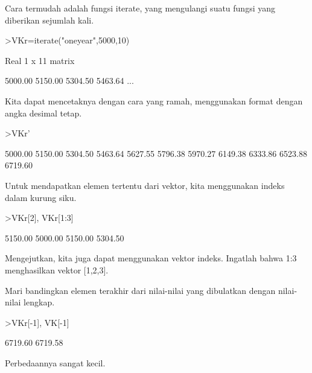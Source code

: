 \documentclass[a4paper,10pt]{article}
\begin{document}
\begin{eulernotebook}
\begin{eulercomment}
\begin{eulercomment}
\begin{eulercomment}
\begin{eulercomment}
\begin{eulercomment}
\begin{eulercomment}
\begin{eulercomment}
\begin{eulercomment}
\begin{eulercomment}
\begin{eulercomment}
\begin{eulercomment}
Cara termudah adalah fungsi iterate, yang mengulangi suatu fungsi yang
diberikan sejumlah kali.
\end{eulercomment}
\begin{eulerprompt}
>VKr=iterate("oneyear",5000,10)
\end{eulerprompt}
\begin{euleroutput}
  Real 1 x 11 matrix
  
      5000.00     5150.00     5304.50     5463.64     ...
\end{euleroutput}
\begin{eulercomment}
Kita dapat mencetaknya dengan cara yang ramah, menggunakan format
dengan angka desimal tetap.
\end{eulercomment}
\begin{eulerprompt}
>VKr'
\end{eulerprompt}
\begin{euleroutput}
      5000.00 
      5150.00 
      5304.50 
      5463.64 
      5627.55 
      5796.38 
      5970.27 
      6149.38 
      6333.86 
      6523.88 
      6719.60 
\end{euleroutput}
\begin{eulercomment}
Untuk mendapatkan elemen tertentu dari vektor, kita menggunakan indeks
dalam kurung siku.
\end{eulercomment}
\begin{eulerprompt}
>VKr[2], VKr[1:3]
\end{eulerprompt}
\begin{euleroutput}
      5150.00 
      5000.00     5150.00     5304.50 
\end{euleroutput}
\begin{eulercomment}
Mengejutkan, kita juga dapat menggunakan vektor indeks. Ingatlah bahwa
1:3 menghasilkan vektor [1,2,3].

Mari bandingkan elemen terakhir dari nilai-nilai yang dibulatkan
dengan nilai-nilai lengkap.
\end{eulercomment}
\begin{eulerprompt}
>VKr[-1], VK[-1]
\end{eulerprompt}
\begin{euleroutput}
      6719.60 
      6719.58 
\end{euleroutput}
\begin{eulercomment}
Perbedaannya sangat kecil.


\end{eulercomment}
\end{eulercomment}
\end{eulercomment}
\end{eulercomment}
\end{eulercomment}
\end{eulercomment}
\end{eulercomment}
\end{eulercomment}
\end{eulercomment}
\end{eulercomment}
\end{eulercomment}
\end{eulernotebook}
\end{document}
